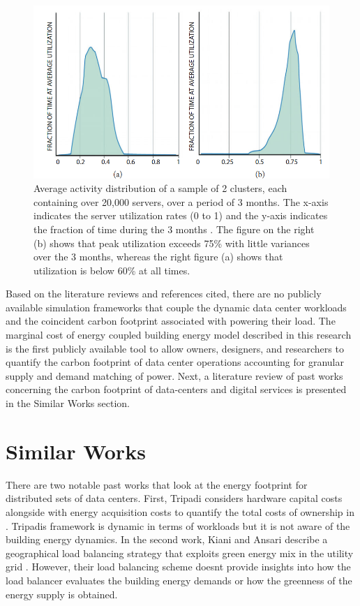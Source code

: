   \begin{figure}
    \centering
    \includegraphics[scale=.2]{marginal_energy_cost/img/google_activity_dist.png}
    \caption[Usage profiles of two production DC Clusters]{Average activity distribution of a sample of 2 clusters, each containing over 20,000 servers, over a period of 3 months. The x-axis indicates the server utilization rates (0 to 1) and the y-axis indicates the fraction of time during the 3 months \cite{barroso18}. The figure on the right (b) shows that peak utilization exceeds 75\% with little variances over the 3 months, whereas the right figure (a) shows that utilization is below 60\% at all times.}
    \label{fig:google_activity_dist}
    \end{figure}

Based on the literature reviews and references cited, there are no publicly available simulation frameworks that couple the dynamic data center workloads and the coincident carbon footprint associated with powering their load. The marginal cost of energy coupled building energy model described in this research is the first publicly available tool to allow owners, designers, and researchers to quantify the carbon footprint of data center operations accounting for granular supply and demand matching of power. Next, a literature review of past works concerning the carbon footprint of data-centers and digital services is presented in the Similar Works section.


\section{Similar Works}
There are two notable past works that look at the energy footprint for distributed sets of data centers. First, Tripadi considers hardware capital costs alongside with energy acquisition costs to quantify the total costs of ownership in \cite{tripadi17}. Tripadi\textsc{}s framework is dynamic in terms of workloads but it is not aware of the building energy dynamics. In the second work, Kiani and Ansari describe a geographical load balancing strategy that exploits green energy mix in the utility grid \cite{kiani17}. However, their load balancing scheme doesn\textsc{}t provide insights into how the load balancer evaluates the building energy demands or how the greenness of the energy supply is obtained. 

